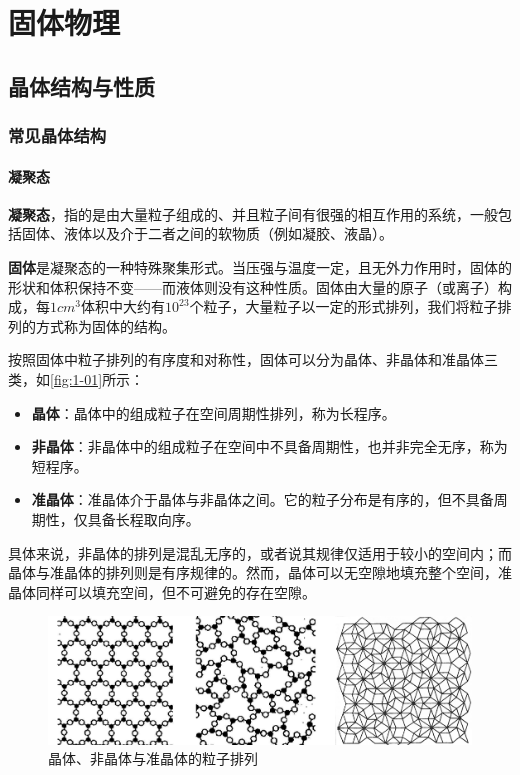 \part{固体物理}
\chapter{晶体结构与性质}
\section{常见晶体结构}
\subsection{凝聚态}
    \textbf{凝聚态}，指的是由大量粒子组成的、并且粒子间有很强的相互作用的系统，一般包括固体、液体以及介于二者之间的软物质（例如凝胶、液晶）。

    \textbf{固体}是凝聚态的一种特殊聚集形式。当压强与温度一定，且无外力作用时，固体的形状和体积保持不变——而液体则没有这种性质。固体由大量的原子（或离子）构成，每$1cm^3$体积中大约有$10^{23}$个粒子，大量粒子以一定的形式排列，我们将粒子排列的方式称为固体的结构。

    按照固体中粒子排列的有序度和对称性，固体可以分为晶体、非晶体和准晶体三类，如\autoref{fig:1-01}所示：
    \begin{itemize}[itemsep=0pt,parsep=0pt]
        \item \textbf{晶体}：晶体中的组成粒子在空间周期性排列，称为长程序。
        \item \textbf{非晶体}：非晶体中的组成粒子在空间中不具备周期性，也并非完全无序，称为短程序。
        \item \textbf{准晶体}：准晶体介于晶体与非晶体之间。它的粒子分布是有序的，但不具备周期性，仅具备长程取向序。
    \end{itemize}
    具体来说，非晶体的排列是混乱无序的，或者说其规律仅适用于较小的空间内；而晶体与准晶体的排列则是有序规律的。然而，晶体可以无空隙地填充整个空间，准晶体同样可以填充空间，但不可避免的存在空隙。

    \begin{figure}[!htbp]
        \centering
        \includegraphics[width=\textwidth, keepaspectratio=true]{pic/1-01}
        \caption{晶体、非晶体与准晶体的粒子排列}
        \label{fig:1-01}
    \end{figure}

